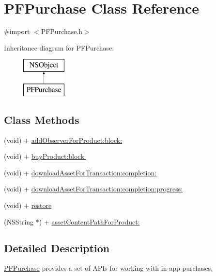 \hypertarget{interface_p_f_purchase}{}\section{P\+F\+Purchase Class Reference}
\label{interface_p_f_purchase}


{\ttfamily \#import $<$P\+F\+Purchase.\+h$>$}

Inheritance diagram for P\+F\+Purchase\+:\begin{figure}[H]
\begin{center}
\leavevmode
\includegraphics[height=2.000000cm]{interface_p_f_purchase}
\end{center}
\end{figure}
\subsection*{Class Methods}
\begin{DoxyCompactItemize}
\item 
(void) + \hyperlink{interface_p_f_purchase_ab8a7fb2066eed2a9106792e9c9d24bdb}{add\+Observer\+For\+Product\+:block\+:}
\item 
(void) + \hyperlink{interface_p_f_purchase_a9aeae4dd74f85e843d4af15339d9a152}{buy\+Product\+:block\+:}
\item 
(void) + \hyperlink{interface_p_f_purchase_a289a556a6058a9fce4d9111025625bd6}{download\+Asset\+For\+Transaction\+:completion\+:}
\item 
(void) + \hyperlink{interface_p_f_purchase_a215951fb7ac348425b413d13bd3ebdc5}{download\+Asset\+For\+Transaction\+:completion\+:progress\+:}
\item 
(void) + \hyperlink{interface_p_f_purchase_a0fed56fd4a6d42ef9dd0e922a2c8a64f}{restore}
\item 
(N\+S\+String $\ast$) + \hyperlink{interface_p_f_purchase_a69a4e5540f439f6d60db9281433ef7be}{asset\+Content\+Path\+For\+Product\+:}
\end{DoxyCompactItemize}


\subsection{Detailed Description}
{\ttfamily \hyperlink{interface_p_f_purchase}{P\+F\+Purchase}} provides a set of A\+P\+Is for working with in-\/app purchases.

